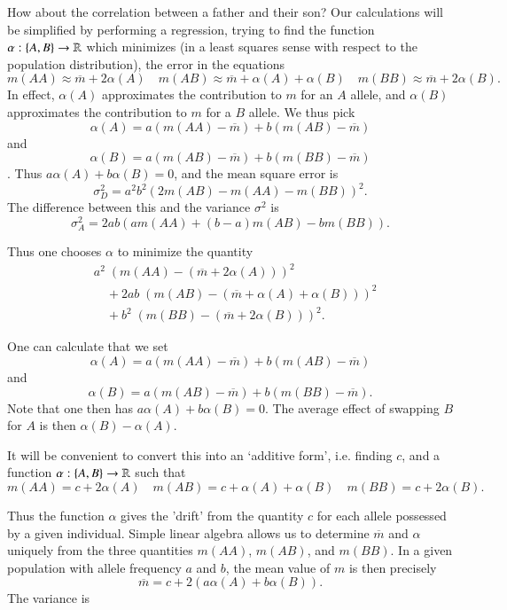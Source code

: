How about the correlation between a father and their son? Our calculations will be simplified by performing a regression, trying to find the function $\alpha: \{ A, B \} \to \operatorname{\mathbb{R}}$ which minimizes (in a least squares sense with respect to the population distribution), the error in the equations
%
\[ m(AA) \approx \overline{m} + 2 \alpha(A) \quad m(AB) \approx \overline{m} + \alpha(A) + \alpha(B) \quad m(BB) \approx \overline{m} + 2 \alpha(B). \]
%
In effect, $\alpha(A)$ approximates the contribution to $m$ for an $A$ allele, and $\alpha(B)$ approximates the contribution to $m$ for a $B$ allele. We thus pick
%
\[ \alpha(A) = a ( m(AA) - \overline{m} ) + b ( m(AB) - \overline{m} ) \]
%
and
%
\[ \alpha(B) = a ( m(AB) - \overline{m} ) + b ( m(BB) - \overline{m} ) \].
%
Thus $a \alpha(A) + b \alpha(B) = 0$, and the mean square error is
%
\[ \sigma_D^2 = a^2 b^2 ( 2 m(AB) - m(AA) - m(BB) )^2. \]
%
The difference between this and the variance $\sigma^2$ is
%
\[ \sigma_A^2 = 2ab ( a m(AA) + (b - a) m(AB) - b m(BB) ). \]

Thus one chooses $\alpha$ to minimize the quantity
%
\begin{align*}
    &a^2\; ( m(AA) - ( \overline{m} + 2 \alpha(A) ) )^2\\
    &\quad + 2ab\; ( m(AB) - ( \overline{m} + \alpha(A) + \alpha(B) ) )^2\\
    &\quad + b^2\; ( m(BB) - (\overline{m} + 2 \alpha(B)) )^2.
\end{align*}

One can calculate that we set
%
\[ \alpha(A) = a ( m(AA) - \overline{m} ) + b ( m(AB) - \overline{m} ) \]
%
and
%
\[ \alpha(B) = a ( m(AB) - \overline{m} ) + b ( m(BB) - \overline{m} ). \]
%
Note that one then has $a \alpha(A) + b \alpha(B) = 0$. The average effect of swapping $B$ for $A$ is then $\alpha(B) - \alpha(A)$.


It will be convenient to convert this into an `additive form', i.e. finding $c$, and a function $\alpha: \{ A, B \} \to \operatorname{\mathbb{R}}$ such that
%
\[ m(AA) = c + 2 \alpha(A) \quad m(AB) = c + \alpha(A) + \alpha(B) \quad m(BB) = c + 2 \alpha(B). \]
%


Thus the function $\alpha$ gives the 'drift' from the quantity $c$ for each allele possessed by a given individual. Simple linear algebra allows us to determine $\overline{m}$ and $\alpha$ uniquely from the three quantities $m(AA)$, $m(AB)$, and $m(BB)$. In a given population with allele frequency $a$ and $b$, the mean value of $m$ is then precisely
%
\[ \overline{m} = c + 2 \left( a \alpha(A) + b \alpha(B) \right). \]
%
The variance is
%
\[  \]


